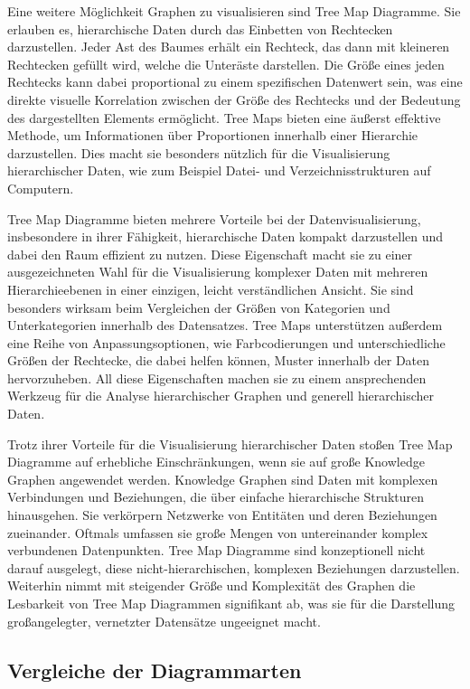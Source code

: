 Eine weitere Möglichkeit Graphen zu visualisieren sind Tree Map Diagramme. Sie erlauben es, hierarchische Daten durch das Einbetten von Rechtecken darzustellen. Jeder Ast des Baumes erhält ein Rechteck, das dann mit kleineren Rechtecken gefüllt wird, welche die Unteräste darstellen. Die Größe eines jeden Rechtecks kann dabei proportional zu einem spezifischen Datenwert sein, was eine direkte visuelle Korrelation zwischen der Größe des Rechtecks und der Bedeutung des dargestellten Elements ermöglicht. Tree Maps bieten eine äußerst effektive Methode, um Informationen über Proportionen innerhalb einer Hierarchie darzustellen. Dies macht sie besonders nützlich für die Visualisierung hierarchischer Daten, wie zum Beispiel Datei- und Verzeichnisstrukturen auf Computern.

Tree Map Diagramme bieten mehrere Vorteile bei der Datenvisualisierung, insbesondere in ihrer Fähigkeit, hierarchische Daten kompakt darzustellen und dabei den Raum effizient zu nutzen. Diese Eigenschaft macht sie zu einer ausgezeichneten Wahl für die Visualisierung komplexer Daten mit mehreren Hierarchieebenen in einer einzigen, leicht verständlichen Ansicht. Sie sind besonders wirksam beim Vergleichen der Größen von Kategorien und Unterkategorien innerhalb des Datensatzes. Tree Maps unterstützen außerdem eine Reihe von Anpassungsoptionen, wie Farbcodierungen und unterschiedliche Größen der Rechtecke, die dabei helfen können, Muster innerhalb der Daten hervorzuheben. All diese Eigenschaften machen sie zu einem ansprechenden Werkzeug für die Analyse hierarchischer Graphen und generell hierarchischer Daten.

Trotz ihrer Vorteile für die Visualisierung hierarchischer Daten stoßen Tree Map Diagramme auf erhebliche Einschränkungen, wenn sie auf große Knowledge Graphen angewendet werden. Knowledge Graphen sind Daten mit komplexen Verbindungen und Beziehungen, die über einfache hierarchische Strukturen hinausgehen. Sie verkörpern Netzwerke von Entitäten und deren Beziehungen zueinander. Oftmals umfassen sie große Mengen von untereinander komplex verbundenen Datenpunkten. Tree Map Diagramme sind konzeptionell nicht darauf ausgelegt, diese nicht-hierarchischen, komplexen Beziehungen darzustellen. Weiterhin nimmt mit steigender Größe und Komplexität des Graphen die Lesbarkeit von Tree Map Diagrammen signifikant ab, was sie für die Darstellung großangelegter, vernetzter Datensätze ungeeignet macht.

\subsection{Vergleiche der Diagrammarten}

